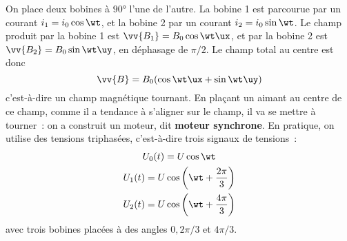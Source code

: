 \documentclass[../main/main.tex]{subfiles}
\begin{document}
On place deux bobines à $\ang{90}$ l'une de l'autre. La bobine 1 est parcourue
par un courant $i_1 = i_0\cos{\wt}$, et la bobine 2 par un courant $i_2 =
	i_0\sin{\wt}$.
Le champ produit par la bobine 1 est $\vv{B_1} = B_0\cos{\wt}\ux$, et par la
bobine 2 est $\vv{B_2} = B_0\sin{\wt}\uy$, en déphasage de $\pi/2$. Le champ
total au centre est donc
\[
	\vv{B} = B_0(\cos{\wt}\ux + \sin{\wt} \uy)
\]
c'est-à-dire un champ magnétique tournant. En plaçant un aimant au centre de ce
champ, comme il a tendance à s'aligner sur le champ, il va se mettre à tourner~:
on a construit un moteur, dit \textbf{moteur synchrone}.
\bigbreak
En pratique, on utilise des tensions triphasées, c'est-à-dire trois signaux de
tensions~:
\begin{gather*}
	U_0(t) = U\cos{\wt}
	\\
	U_1(t) = U\cos{\left( \wt + \frac{2\pi}{3} \right)}
	\\
	U_2(t) = U\cos{\left( \wt + \frac{4\pi}{3} \right)}
\end{gather*}
avec trois bobines placées à des angles $0, 2\pi/3$ et $4\pi/3$.
\end{document}
